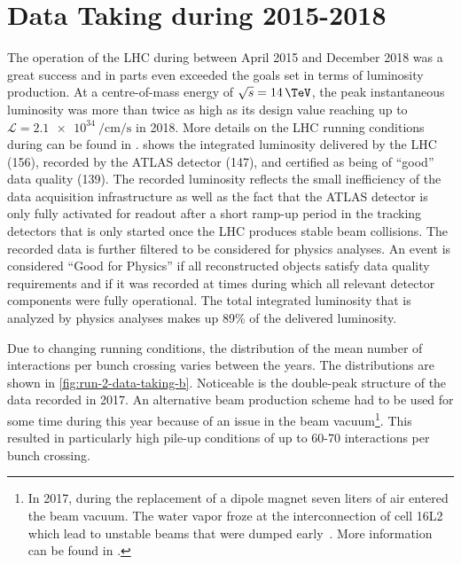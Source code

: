 \section{Data Taking during 2015-2018}
\label{sec:run-2-data-taking}

The operation of the LHC during \RunTwo between April 2015 and December 2018 was a great success and in parts even exceeded the goals set in terms of luminosity production. At a centre-of-mass energy of $\sqrt{s} = 14\,\TeV$, the peak instantaneous luminosity was more than twice as high as its design value reaching up to $\mathcal{L} = \SI{2.1e34}{\per\cm\per\s}$ in 2018. More details on the LHC running conditions during \RunTwo can be found in .
 shows the integrated luminosity delivered by the LHC (156\ifb), recorded by the ATLAS detector (147\ifb), and certified as being of ``good'' data quality (139\ifb).
The recorded luminosity reflects the small inefficiency of the data acquisition infrastructure as well as the fact that the ATLAS detector is only fully activated for readout after a short ramp-up period in the tracking detectors that is only started once the LHC produces stable beam collisions.
The recorded data is further filtered to be considered for physics analyses.
An event is considered ``Good for Physics'' if all reconstructed objects satisfy data quality requirements and if it was recorded at times during which all relevant detector components were fully operational.
The total integrated luminosity that is analyzed by physics analyses makes up 89\% of the delivered luminosity.

Due to changing running conditions, the distribution of the mean number of interactions per bunch crossing varies between the years.
The distributions are shown in \cref{fig:run-2-data-taking-b}.
Noticeable is the double-peak structure of the data recorded in 2017.
An alternative beam production scheme had to be used for some time during this year because of an issue in the beam vacuum\footnote{In 2017, during the replacement of a dipole magnet seven liters of air entered the beam vacuum. The water vapor froze at the interconnection of cell 16L2 which lead to unstable beams that were dumped early~\cite{Jimenez:2646067,Salvant:2646056}. More information can be found in .}. This resulted in particularly high pile-up conditions of up to 60-70 interactions per bunch crossing.

